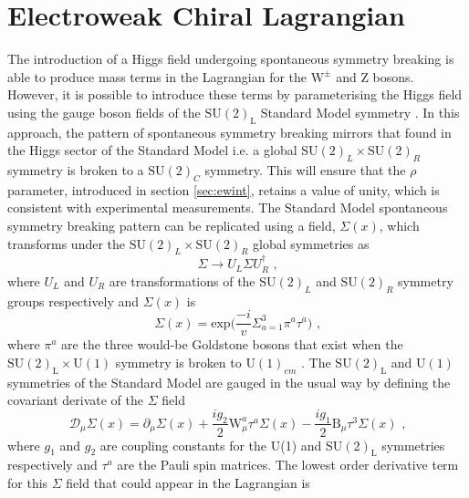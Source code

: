 
\section{Electroweak Chiral Lagrangian}
The introduction of a Higgs field undergoing spontaneous symmetry breaking is able to produce mass terms in the Lagrangian for the $\text{W}^{\pm}$ and Z bosons.  However, it is possible to introduce these terms by parameterising the Higgs field using the gauge boson fields of the $\text{SU}(2)_{\text{L}}$ Standard Model symmetry \cite{Herrero:1994tj}.  In this approach, the pattern of spontaneous symmetry breaking mirrors that found in the Higgs sector of the Standard Model i.e. a global $\text{SU}(2)_{L} \times \text{SU}(2)_{R}$ symmetry is broken to a $\text{SU}(2)_{C}$ symmetry.  This will ensure that the $\rho$ parameter, introduced in section \ref{sec:ewint}, retains a value of unity, which is consistent with experimental measurements.  The Standard Model spontaneous symmetry breaking pattern can be replicated using a field, $\Sigma(x)$, which transforms under the $\text{SU}(2)_{L} \times \text{SU}(2)_{R}$ global symmetries as
%
\begin{equation}
\Sigma \rightarrow U_{L} \Sigma U_{R}^{\dagger} \text{ ,}
\end{equation}
%
\noindent where $U_{L}$ and $U_{R}$ are transformations of the $\text{SU}(2)_{L}$ and $\text{SU}(2)_{R}$ symmetry groups respectively and $\Sigma(x)$ is
%
\begin{equation}
\Sigma(x) = \text{exp} \bigg(\frac{-i}{v} \Sigma^{3}_{a=1} \pi^{a}\tau^{a}\bigg)\text{ ,}
\end{equation}
%
\noindent where $\pi^{a}$ are the three would-be Goldstone bosons that exist when the $\text{SU}(2)_{\text{L}} \times \text{U}(1)$ symmetry is broken to $\text{U}(1)_{em}$ \cite{Longhitano:1980tm}.  The $\text{SU}(2)_{\text{L}}$ and $\text{U}(1)$ symmetries of the Standard Model are gauged in the usual way by defining the covariant derivate of the $\Sigma$ field
%
\begin{equation}
\mathcal{D}_{\mu} \Sigma(x) = \partial_{\mu} \Sigma(x) + \frac{ig_{2}}{2}\text{W}_{\mu}^{a}\tau^{a}\Sigma(x) - \frac{ig_{1}}{2}\text{B}_{\mu}\tau^{3}\Sigma(x) \text{ ,}
\end{equation}
%
\noindent where $g_{1}$ and $g_{2}$ are coupling constants for the U(1) and SU$(2)_\text{L}$ symmetries respectively and $\tau^{a}$ are the Pauli spin matrices.  The lowest order derivative term for this $\Sigma$ field that could appear in the Lagrangian is
